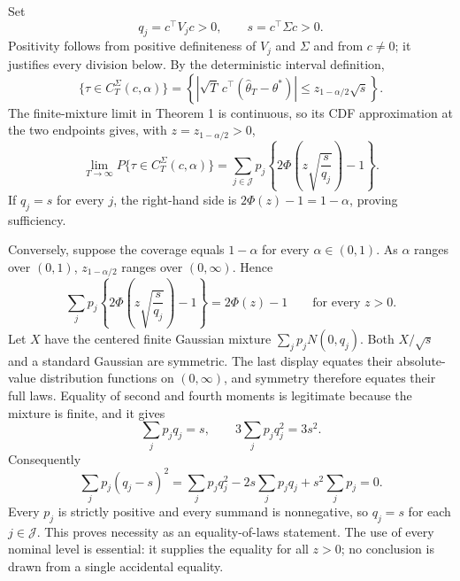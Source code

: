 Set
\[
 q_j=c^\top V_jc>0,
 \qquad s=c^\top\Sigma c>0.
\]
Positivity follows from positive definiteness of \(V_j\) and \(\Sigma\) and from \(c\ne0\); it justifies every division below. By the deterministic interval definition,
\[
 \{\tau\in C_T^\Sigma(c,\alpha)\}
 =\left\{\left|\sqrt T\,c^\top(\widehat\theta_T-\theta^*)\right|
 \le z_{1-\alpha/2}\sqrt{s}\right\}.
\]
The finite-mixture limit in Theorem 1 is continuous, so its CDF approximation at the two endpoints gives, with \(z=z_{1-\alpha/2}>0\),
\[
 \lim_{T\to\infty}P\{\tau\in C_T^\Sigma(c,\alpha)\}
 =\sum_{j\in\mathcal J}p_j\left\{2\Phi\left(z\sqrt{\frac{s}{q_j}}\right)-1\right\}.
\]
If \(q_j=s\) for every \(j\), the right-hand side is \(2\Phi(z)-1=1-\alpha\), proving sufficiency.

Conversely, suppose the coverage equals \(1-\alpha\) for every \(\alpha\in(0,1)\). As \(\alpha\) ranges over \((0,1)\), \(z_{1-\alpha/2}\) ranges over \((0,\infty)\). Hence
\[
 \sum_jp_j\left\{2\Phi\left(z\sqrt{\frac{s}{q_j}}\right)-1\right\}
 =2\Phi(z)-1
 \qquad\text{for every }z>0.
\]
Let \(X\) have the centered finite Gaussian mixture \(\sum_jp_jN(0,q_j)\). Both \(X/\sqrt s\) and a standard Gaussian are symmetric. The last display equates their absolute-value distribution functions on \((0,\infty)\), and symmetry therefore equates their full laws. Equality of second and fourth moments is legitimate because the mixture is finite, and it gives
\[
 \sum_jp_jq_j=s,
 \qquad
 3\sum_jp_jq_j^2=3s^2.
\]
Consequently
\[
 \sum_jp_j(q_j-s)^2
 =\sum_jp_jq_j^2-2s\sum_jp_jq_j+s^2\sum_jp_j=0.
\]
Every \(p_j\) is strictly positive and every summand is nonnegative, so \(q_j=s\) for each \(j\in\mathcal J\). This proves necessity as an equality-of-laws statement. The use of every nominal level is essential: it supplies the equality for all \(z>0\); no conclusion is drawn from a single accidental equality.
